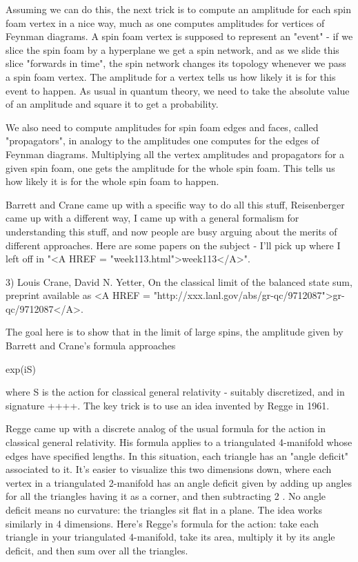 Assuming we can do this, the next trick is to compute an amplitude
for each spin foam vertex in a nice way, much as one computes
amplitudes for vertices of Feynman diagrams.  A spin foam vertex is
supposed to represent an "event" - if we slice the spin
foam by a hyperplane we get a spin network, and as we slide this slice
"forwards in time", the spin network changes its topology
whenever we pass a spin foam vertex.  The amplitude for a vertex tells
us how likely it is for this event to happen.  As usual in quantum
theory, we need to take the absolute value of an amplitude and square
it to get a probability.

We also need to compute amplitudes for spin foam edges and faces,
called "propagators", in analogy to the amplitudes one computes for
the edges of Feynman diagrams.  Multiplying all the vertex amplitudes
and propagators for a given spin foam, one gets the amplitude for the
whole spin foam.  This tells us how likely it is for the whole spin
foam to happen.

Barrett and Crane came up with a specific way to do all this stuff,
Reisenberger came up with a different way, I came up with a general
formalism for understanding this stuff, and now people are busy
arguing about the merits of different approaches.  Here are some
papers on the subject - I'll pick up where I left off in "<A
HREF = "week113.html">week113</A>".

3) Louis Crane, David N. Yetter, On the classical limit of the
balanced state sum, preprint available as <A HREF =
"http://xxx.lanl.gov/abs/gr-qc/9712087">gr-qc/9712087</A>.

The goal here is to show that in the limit of large spins, the
amplitude given by Barrett and Crane's formula approaches 

exp(iS)

where S is the action for classical general relativity - suitably
discretized, and in signature ++++.  The key trick is to use an idea
invented by Regge in 1961.

Regge came up with a discrete analog of the usual formula for the
action in classical general relativity.  His formula applies to a
triangulated 4-manifold whose edges have specified lengths.  In this
situation, each triangle has an "angle deficit" associated to it.
It's easier to visualize this two dimensions down, where each vertex
in a triangulated 2-manifold has an angle deficit given by adding up
angles for all the triangles having it as a corner, and then
subtracting 2 \pi .  No angle deficit means no curvature: the triangles
sit flat in a plane.  The idea works similarly in 4 dimensions.
Here's Regge's formula for the action: take each triangle in your
triangulated 4-manifold, take its area, multiply it by its angle
deficit, and then sum over all the triangles.  

